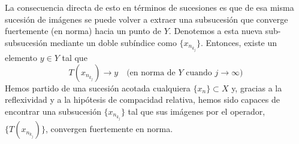 \begin{ejercicio}
    \noindent
    La consecuencia directa de esto en términos de sucesiones es que de esa misma sucesión de imágenes se puede volver a extraer una subsucesión que converge fuertemente (en norma) hacia un punto de $Y$. Denotemos a esta nueva sub-subsucesión mediante un doble subíndice como $\{x_{n_{k_j}}\}$. Entonces, existe un elemento $y \in Y$ tal que
    $$ T(x_{n_{k_j}}) \longrightarrow y \quad \text{(en norma de } Y\text{ cuando } j \to \infty) $$
    Hemos partido de una sucesión acotada cualquiera $\{x_n\} \subset X$ y, gracias a la reflexividad y a la hipótesis de compacidad relativa, hemos sido capaces de encontrar una subsucesión $\{x_{n_{k_j}}\}$ tal que sus imágenes por el operador, $\{T(x_{n_{k_j}})\}$, convergen fuertemente en norma.
\end{ejercicio}


